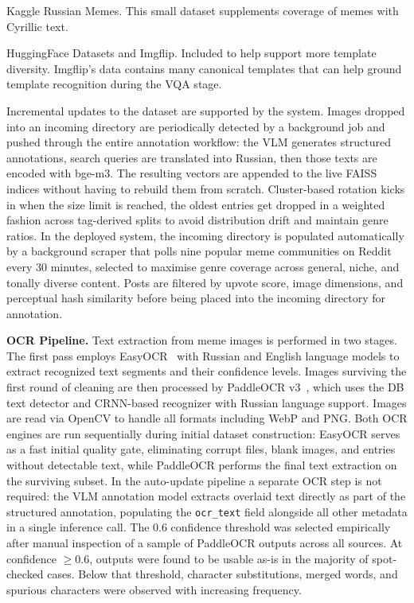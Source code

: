 \documentclass[a4paper,12pt]{article}
\begin{document}
Kaggle Russian Memes. This small dataset supplements coverage of memes with Cyrillic text.

HuggingFace Datasets and Imgflip. Included to help support more template diversity. Imgflip's data contains many canonical templates that can help ground template recognition during the VQA stage.

Incremental updates to the dataset are supported by the system. Images dropped into an incoming directory are periodically detected by a background job and pushed through the entire annotation workflow: the VLM generates structured annotations, search queries are translated into Russian, then those texts are encoded with bge-m3. The resulting vectors are appended to the live FAISS indices without having to rebuild them from scratch. Cluster-based rotation kicks in when the size limit is reached, the oldest entries get dropped in a weighted fashion across tag-derived splits to avoid distribution drift and maintain genre ratios. In the deployed system, the incoming directory is populated automatically by a background scraper that polls nine popular meme communities on Reddit every 30 minutes, selected to maximise genre coverage across general, niche, and tonally diverse content. Posts are filtered by upvote score, image dimensions, and perceptual hash similarity before being placed into the incoming directory for annotation.

\textbf{OCR Pipeline.} Text extraction from meme images is performed in two stages. The first pass employs EasyOCR~\cite{jaidedai2020easyocr} with Russian and English language models to extract recognized text segments and their confidence levels. Images surviving the first round of cleaning are then processed by PaddleOCR v3~\cite{du2020ppocr}, which uses the DB text detector and CRNN-based recognizer with Russian language support. Images are read via OpenCV to handle all formats including WebP and PNG. Both OCR engines are run sequentially during initial dataset construction: EasyOCR serves as a fast initial quality gate, eliminating corrupt files, blank images, and entries without detectable text, while PaddleOCR performs the final text extraction on the surviving subset. In the auto-update pipeline a separate OCR step is not required: the VLM annotation model extracts overlaid text directly as part of the structured annotation, populating the \texttt{ocr\_text} field alongside all other metadata in a single inference call. The 0.6 confidence threshold was selected empirically after manual inspection of a sample of PaddleOCR outputs across all sources. At confidence $\geq 0.6$, outputs were found to be usable as-is in the majority of spot-checked cases. Below that threshold, character substitutions, merged words, and spurious characters were observed with increasing frequency.
\end{document}

